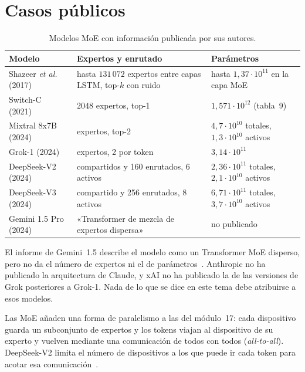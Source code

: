 \section{Casos públicos}

\begin{table}[ht]
\centering\small
\caption{Modelos MoE con información publicada por sus autores.}\label{tab:moe}
\begin{tabularx}{\textwidth}{@{}l>{\raggedright\arraybackslash}X>{\raggedright\arraybackslash}X@{}}
\toprule
Modelo & Expertos y enrutado & Parámetros \\
\midrule
Shazeer \emph{et al.} (2017)~\cite{shazeer2017} & hasta $131\,072$ expertos entre capas LSTM, top-$k$ con ruido & hasta $1{,}37\cdot 10^{11}$ en la capa MoE \\
Switch-C (2021)~\cite{switch} & $2048$ expertos, top-1 & $1{,}571\cdot 10^{12}$ (tabla~9) \\
Mixtral 8x7B (2024)~\cite{mixtral} & 8 expertos, top-2 & $4{,}7\cdot 10^{10}$ totales, $1{,}3\cdot 10^{10}$ activos \\
Grok-1 (2024)~\cite{grok1} & 8 expertos, 2 por token & $3{,}14\cdot 10^{11}$ \\
DeepSeek-V2 (2024)~\cite{deepseekv2} & 2 compartidos y 160 enrutados, 6 activos & $2{,}36\cdot 10^{11}$ totales, $2{,}1\cdot 10^{10}$ activos \\
DeepSeek-V3 (2024)~\cite{deepseekv3} & 1 compartido y 256 enrutados, 8 activos & $6{,}71\cdot 10^{11}$ totales, $3{,}7\cdot 10^{10}$ activos \\
Gemini 1.5 Pro (2024)~\cite{gemini15} & «Transformer de mezcla de expertos dispersa» & no publicado \\
\bottomrule
\end{tabularx}
\end{table}

\begin{observacion}
El informe de Gemini~1.5 describe el modelo como un Transformer MoE disperso, pero no da el número de expertos ni el de parámetros~\cite[§3.1]{gemini15}. Anthropic no ha publicado la arquitectura de Claude, y xAI no ha publicado la de las versiones de Grok posteriores a Grok-1. Nada de lo que se dice en este tema debe atribuirse a esos modelos.
\end{observacion}

\begin{observacion}
Las MoE añaden una forma de paralelismo a las del módulo~17: cada dispositivo guarda un subconjunto de expertos y los tokens viajan al dispositivo de su experto y vuelven mediante una comunicación de todos con todos (\emph{all-to-all}). DeepSeek-V2 limita el número de dispositivos a los que puede ir cada token para acotar esa comunicación~\cite[§2.2.2]{deepseekv2}.
\end{observacion}

